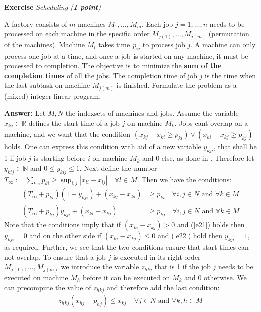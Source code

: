 \documentclass[a4paper,10pt]{article}
\newcounter{exc}
\newenvironment{exercise}[1]%
{\refstepcounter{exc}\textbf{Exercise \arabic{exc}} \emph{#1}\\}
{

\hrulefill\medskip}%
\begin{document}
\begin{exercise}{Scheduling (\textbf{1 point})}\label{ex:jss}

A factory consists of $m$ machines $M_1, \dots, M_m$.
Each job $j=1,\ldots,n$ needs to be processed on each machine in the specific order $M_{j(1)},\dots,M_{j(m)}$ (permutation of the machines). Machine $M_i$ takes time $p_{ij}$ to process job $j$. A machine can only process one job at a time, and once a job is started on any machine, it must be processed to completion. The objective is to minimize the \textbf{sum of the completion times} of all the jobs. The completion time of job $j$ is the time when the last subtask on machine $M_{j(m)}$ is finished. Formulate the problem as a (mixed) integer linear program.

  \textbf{Answer:}
  Let $M,N$ the indexsets of machines and jobs. Assume the variable $x_{kj}\in\mathbb{R}$ defines the start time of a job $j$ on machine $M_k$. Jobs cant overlap on a machine, and we want that the condition $(x_{kj} - x_{ki}\geq p_{ki}) \vee (x_{ki} - x_{kj}\geq p_{kj})$ holds. One can express this condition with aid of a new variable $y_{kji}$, that shall be 1 if job $j$ is starting before $i$ on machine $M_k$ and 0 else, as done in \cite{manne1960job}. Therefore let $y_{kij}\in \mathbb{N}$ and $0\leq y_{kij}\leq 1$. Next define the number $T_{\infty} := \sum_{k,i}p_{ki}\geq \sup_{i,j}|x_{li}-x_{lj}| \quad\forall l\in M$.
Then we have the conditions:
\begin{align}
  (T_\infty+p_{ki})(1-y_{kji}) + (x_{kj} - x_{ki}) & \geq p_{ki} \quad \forall i,j\in N \text{ and } \forall k\in M\label{e21}\\
(T_\infty+p_{kj})y_{kji} + (x_{ki} - x_{kj}) & \geq p_{kj} \quad \forall i,j\in N \text{ and } \forall k\in M\label{e22}
\end{align}
Note that the conditions imply that if $(x_{ki} - x_{kj})>0 $ and (\ref{e21}) holds then $y_{kji}=0$ and on the other side if $(x_{ki} - x_{kj})\leq 0$ and (\ref{e22}) hold then $y_{kji} =1 $, as required. Further, we see that the two conditions ensure that start times can not overlap.
To ensure that a job $j$ is executed in its right order $M_{j(1)},\dots,M_{j(m)}$ we introduce the variable $z_{hkj}$ that is 1 if the job $j$ needs to be executed on machine $M_h$ before it can be executed on $M_k$ and 0 otherwise. We can precompute the value of $z_{hkj}$ and therefore add the last condition:
\begin{align}
  z_{hkj}(x_{hj} + p_{hj}) \leq x_{kj} \quad\forall j \in N \text{ and } \forall k,h\in M

\end{align}
\end{exercise}
\end{document}
